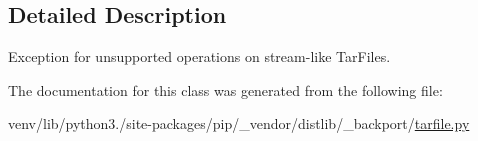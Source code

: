 \subsection{Detailed Description}
\begin{DoxyVerb}Exception for unsupported operations on stream-like TarFiles.\end{DoxyVerb}
 

The documentation for this class was generated from the following file\+:\begin{DoxyCompactItemize}
\item 
venv/lib/python3./site-\/packages/pip/\+\_\+vendor/distlib/\+\_\+backport/\hyperlink{tarfile_8py}{tarfile.\+py}\end{DoxyCompactItemize}
